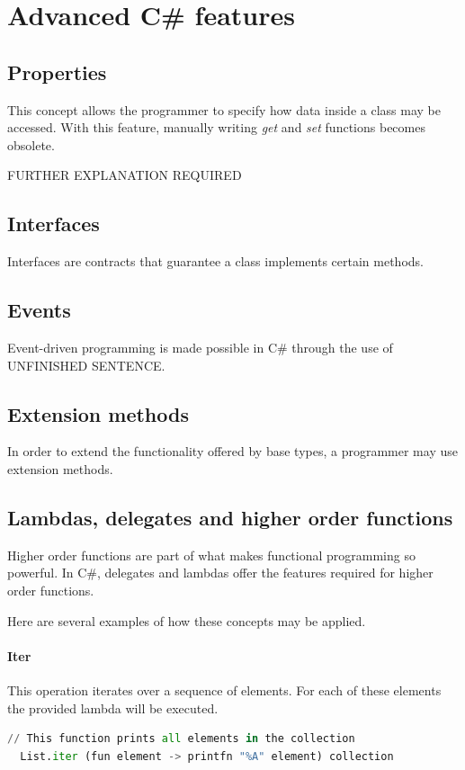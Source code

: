 \documentclass{article}
\begin{document}
\newpage

\section{Advanced C\# features}
\subsection{Properties}
This concept allows the programmer to specify how data inside a class may be accessed.
With this feature, manually writing {\em get} and {\em set} functions becomes obsolete.

{\huge FURTHER EXPLANATION REQUIRED}

\subsection{Interfaces}
Interfaces are contracts that guarantee a class implements certain methods.

\subsection{Events}
Event-driven programming is made possible in C\# through the use of {\huge UNFINISHED SENTENCE}.

\subsection{Extension methods}
In order to extend the functionality offered by base types, a programmer may use extension methods.

\subsection{Lambdas, delegates and higher order functions}
Higher order functions are part of what makes functional programming so powerful.
In C\#, delegates and lambdas offer the features required for higher order functions.

Here are several examples of how these concepts may be applied.

\paragraph{Iter}
This operation iterates over a sequence of elements. For each of these elements the provided lambda will be executed.

\begin{lstlisting}[language=Python]
  // This function prints all elements in the collection
  List.iter (fun element -> printfn "%A" element) collection
\end{lstlisting}
\end{document}
